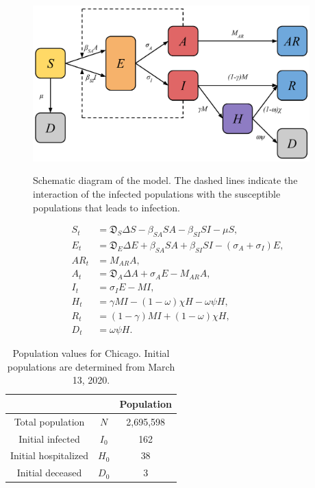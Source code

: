\documentclass[11pt]{article}
\newcommand{\D}{\mathfrak{D}}
\begin{document}
	\begin{figure}[h!]
		\centering
		\includegraphics[height=6cm]{full-model}
		\label{fig:model}
		\caption{Schematic diagram of the model. The dashed lines indicate the interaction of the infected populations with the susceptible populations that leads to infection.}
	\end{figure}

	\begin{align}
		S_t &=	\D_S \Delta S - \beta_{SA} S A - \beta_{SI} S I - \mu S, \\
		E_t	&=	\D_E \Delta E + \beta_{SA} S A + \beta_{SI} S I - (\sigma_A + \sigma_I) E, \\
		AR_t &= M_{AR} A, \\
		A_t	&=	\D_A \Delta A + \sigma_A E - M_{AR} A, \\
		I_t	&=	\sigma_I E - M I, \\
		H_t	&=	\gamma M I - (1 - \omega) \chi H - \omega \psi H, \\
		R_t	&=	(1 - \gamma) M I + (1 - \omega) \chi H, \\
		D_t	&=	\omega \psi H.
	\end{align}
	
	\begin{table}[h]
		\centering
		\caption{Population values for Chicago.
			Initial populations are determined from March 13, 2020.}
		\label{tab:populations}
		\begin{tabular}{ c c c }
			\hline
			\hline
			&	&	Population \\
			\hline
			Total population		&	$N$		&	2,695,598 \\
			Initial infected		&	$I_0$	&	162	\\
			Initial hospitalized	&	$H_0$	&	38 \\
			Initial deceased		&	$D_0$	&	3 \\
			\hline
			\hline
		\end{tabular}
	\end{table}
	
\end{document}
